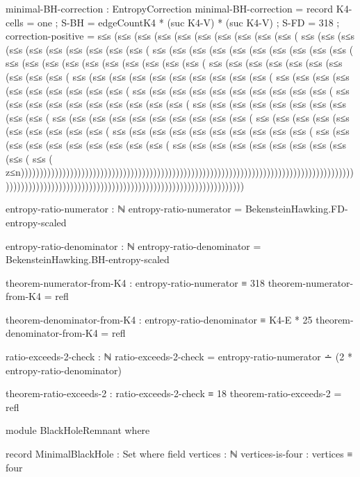 \documentclass[11pt,a4paper]{book}
\begin{document}
\begin{code}
  minimal-BH-correction : EntropyCorrection
  minimal-BH-correction = record
    { K4-cells = one
    ; S-BH = edgeCountK4 * (suc K4-V) * (suc K4-V)
    ; S-FD = 318
    ; correction-positive = s≤s (s≤s (s≤s (s≤s (s≤s (s≤s (s≤s (s≤s (s≤s (s≤s (
                           s≤s (s≤s (s≤s (s≤s (s≤s (s≤s (s≤s (s≤s (s≤s (s≤s (
                           s≤s (s≤s (s≤s (s≤s (s≤s (s≤s (s≤s (s≤s (s≤s (s≤s (
                           s≤s (s≤s (s≤s (s≤s (s≤s (s≤s (s≤s (s≤s (s≤s (s≤s (
                           s≤s (s≤s (s≤s (s≤s (s≤s (s≤s (s≤s (s≤s (s≤s (s≤s (
                           s≤s (s≤s (s≤s (s≤s (s≤s (s≤s (s≤s (s≤s (s≤s (s≤s (
                           s≤s (s≤s (s≤s (s≤s (s≤s (s≤s (s≤s (s≤s (s≤s (s≤s (
                           s≤s (s≤s (s≤s (s≤s (s≤s (s≤s (s≤s (s≤s (s≤s (s≤s (
                           s≤s (s≤s (s≤s (s≤s (s≤s (s≤s (s≤s (s≤s (s≤s (s≤s (
                           s≤s (s≤s (s≤s (s≤s (s≤s (s≤s (s≤s (s≤s (s≤s (s≤s (
                           s≤s (s≤s (s≤s (s≤s (s≤s (s≤s (s≤s (s≤s (s≤s (s≤s (
                           s≤s (s≤s (s≤s (s≤s (s≤s (s≤s (s≤s (s≤s (s≤s (s≤s (
                           s≤s (s≤s (s≤s (s≤s (s≤s (s≤s (s≤s (s≤s (s≤s (s≤s (
                           s≤s (s≤s (s≤s (s≤s (s≤s (s≤s (s≤s (s≤s (s≤s (s≤s (
                           s≤s (s≤s (s≤s (s≤s (s≤s (s≤s (s≤s (s≤s (s≤s (s≤s (
                           s≤s (
                           z≤n)))))))))))))))))))))))))))))))))))))))))))))))))))))))))))))))))))))))))))))))))))))))))))))))))))))))))))))))))))))))))))))))))))))))))))))))))))))))
    }
  
  entropy-ratio-numerator : ℕ
  entropy-ratio-numerator = BekensteinHawking.FD-entropy-scaled
  
  entropy-ratio-denominator : ℕ
  entropy-ratio-denominator = BekensteinHawking.BH-entropy-scaled
  
  theorem-numerator-from-K4 : entropy-ratio-numerator ≡ 318
  theorem-numerator-from-K4 = refl
  
  theorem-denominator-from-K4 : entropy-ratio-denominator ≡ K4-E * 25
  theorem-denominator-from-K4 = refl
  
  ratio-exceeds-2-check : ℕ
  ratio-exceeds-2-check = entropy-ratio-numerator ∸ (2 * entropy-ratio-denominator)
  
  theorem-ratio-exceeds-2 : ratio-exceeds-2-check ≡ 18
  theorem-ratio-exceeds-2 = refl

module BlackHoleRemnant where

  record MinimalBlackHole : Set where
    field
      vertices : ℕ
      vertices-is-four : vertices ≡ four
      

\end{code}
\end{document}

